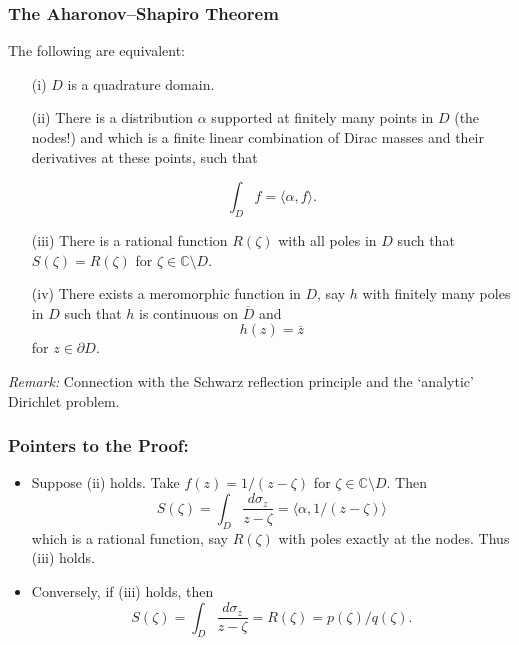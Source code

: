 \documentclass{beamer}
\begin{document}
\begin{frame}
 \frametitle{The Aharonov--Shapiro Theorem}

The following are equivalent:

\begin{enumerate}

\item[(i)] $D$ is a quadrature domain.

\item[(ii)] There is a distribution $\alpha$ supported at finitely many points in $D$ (the nodes!) and which is a finite linear combination of Dirac masses and their derivatives at 
these points, such that

\[
\int _D f = \langle \alpha, f \rangle.
\]

\end{enumerate}

\end{frame}


\begin{frame}

\begin{enumerate}

\item[(iii)] There is a rational function $R(\zeta)$ with all poles in $D$ such that $S(\zeta) = R(\zeta)$ for $\zeta \in \mathbb C \setminus D$.

\item[(iv)] There exists a meromorphic function in $D$, say $h$ with finitely many poles in $D$ such that $h$ is continuous on $\overline D$ and 
\[
h(z) = \overline z
\]
for  $z \in \partial D$.

\end{enumerate}

\medskip

{\it Remark:} Connection with the Schwarz reflection principle and the `analytic' Dirichlet problem.

\end{frame}


\begin{frame}
 \frametitle{Pointers to the Proof:}
\begin{itemize}

\item Suppose (ii) holds. Take $f(z) = 1/(z - \zeta)$ for $\zeta \in \mathbb C \setminus D$. Then
\[
S(\zeta) = \int_D \frac{d \sigma_z}{z - \zeta} = \langle \alpha, 1/(z - \zeta) \rangle
\]
which is a rational function, say $R(\zeta)$ with poles exactly at the nodes. Thus (iii) holds.

\item Conversely, if (iii) holds, then
\[
S(\zeta) = \int_D \frac{d \sigma_z}{z - \zeta} = R(\zeta) = p(\zeta)/q(\zeta).
\]

\end{itemize}

\end{frame}
\end{document}
